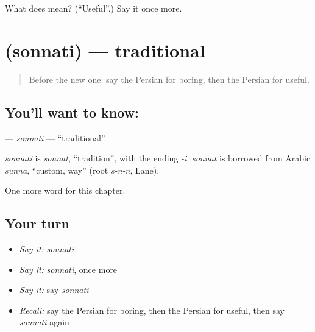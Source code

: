 \begin{tcolorbox}[breakable,colback=teal!4,colframe=teal!35!black,title={Before you move on}]
What does  mean? (\textquotedblleft{}Useful\textquotedblright{}.) Say it once more.
\end{tcolorbox}
\section[\texorpdfstring{\fa{سنتی} (sonnati)}{سنتی (sonnati)}]{ (sonnati) — traditional}

\label{lesson:FA-C273-sonnati}



\begin{quote}
Before the new one: say the Persian for boring, then the Persian for useful.
\end{quote}

\subsection*{You'll want to know: }
\textbf{} — \emph{sonnati} — \textquotedblleft{}traditional\textquotedblright{}.

\begin{cousinweb}
\emph{sonnati} is \emph{sonnat}, \textquotedblleft{}tradition\textquotedblright{}, with the ending \emph{-i}. \emph{sonnat} is borrowed from Arabic \emph{sunna}, \textquotedblleft{}custom, way\textquotedblright{} (root \emph{s-n-n}, Lane).
\end{cousinweb}

\begin{grammarlens}[title={What you've built}]
One more word for this chapter.
\end{grammarlens}

\subsection*{Your turn}
\begin{itemize}
\raggedright
  \item \emph{Say it:} \emph{sonnati}
  \item \emph{Say it:} \emph{sonnati}, once more
  \item \emph{Say it:} say \emph{sonnati}
  \item \emph{Recall:} say the Persian for boring, then the Persian for useful, then say \emph{sonnati} again
\end{itemize}

